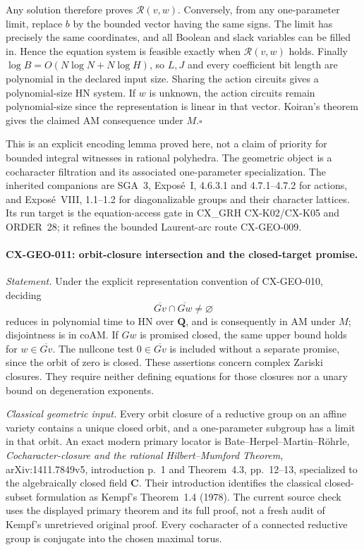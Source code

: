 Any solution therefore proves $\mathcal R(v,w)$. Conversely, from any
one-parameter limit, replace $b$ by the bounded vector having the same
signs. The limit has precisely the same coordinates, and all Boolean
and slack variables can be filled in. Hence the equation system is
feasible exactly when $\mathcal R(v,w)$ holds.
Finally $\log B=O(N\log N+N\log H)$, so $L,J$ and every coefficient
bit length are polynomial in the declared input size. Sharing the action
circuits gives a polynomial-size HN system. If $w$ is unknown, the action
circuits remain polynomial-size since the representation is linear in
that vector. Koiran's theorem gives the claimed AM consequence under
$M$.\hfill$\square$

This is an explicit encoding lemma proved here, not a claim of priority
for bounded integral witnesses in rational polyhedra. The geometric
object is a cocharacter filtration and its associated one-parameter
specialization. The inherited companions are SGA~3, Expos\'e~I,
4.6.3.1 and 4.7.1--4.7.2 for actions, and Expos\'e~VIII, 1.1--1.2 for
diagonalizable groups and their character lattices. Its run target is
the equation-access gate in CX\_GRH CX-K02/CX-K05 and ORDER~28; it
refines the bounded Laurent-arc route CX-GEO-009.

\paragraph{CX-GEO-011: orbit-closure intersection and the closed-target promise.}
\emph{Statement.} Under the explicit representation convention of
CX-GEO-010, deciding
\[
             \overline{Gv}\cap\overline{Gw}\ne\varnothing
\]
reduces in polynomial time to HN over $\mathbf Q$, and is consequently
in AM under $M$; disjointness is in coAM. If $Gw$ is promised closed,
the same upper bound holds for $w\in\overline{Gv}$. The nullcone test
$0\in\overline{Gv}$ is included without a separate promise, since the
orbit of zero is closed. These assertions concern complex Zariski
closures. They require neither defining equations for those closures nor
a unary bound on degeneration exponents.

\emph{Classical geometric input.} Every orbit closure of a reductive
group on an affine variety contains a unique closed orbit, and a
one-parameter subgroup has a limit in that orbit. An exact modern primary
locator is Bate--Herpel--Martin--R\"ohrle,
\emph{Cocharacter-closure and the rational Hilbert--Mumford Theorem},
arXiv:1411.7849v5, introduction p.~1 and Theorem~4.3, pp.~12--13,
specialized to the algebraically closed field $\mathbf C$.
Their introduction identifies the classical closed-subset formulation
as Kempf's Theorem~1.4 (1978). The current source check uses the displayed
primary theorem and its full proof, not a fresh audit of Kempf's
unretrieved original proof. Every cocharacter of a connected reductive
group is conjugate into the chosen maximal torus.

